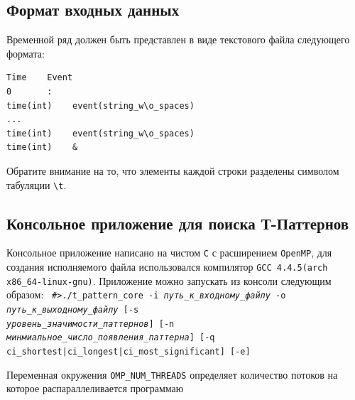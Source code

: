 \documentclass[12pt,fсeqn]{article}
\begin{document}
\subsection{Формат входных данных}
Временной ряд должен быть представлен в виде текстового файла следующего формата:
\begin{verbatim}
Time    Event
0       :
time(int)    event(string_w\o_spaces)
...
time(int)    event(string_w\o_spaces)
time(int)    &
\end{verbatim}
Обратите внимание на то, что элементы каждой строки разделены
символом табуляции \verb!\t!.

\subsection{Консольное приложение для поиска Т-Паттернов}
Консольное приложение написано на чистом \verb!C! с расширением \verb!OpenMP!, для
создания исполняемого файла использовался компилятор \verb!GCC 4.4.5(arch x86_64-linux-gnu)!. Приложение
можно запускать из консоли следующим образом:
\texttt{
\#>./t\_pattern\_core -i {\em путь\_к\_входному\_файлу} -o {\em путь\_к\_выходному\_файлу}
[-s \\{\em уровень\_значимости\_паттернов}] [-n {\em минмиальное\_число\_появления\_паттерна}]
[-q ci\_shortest|ci\_longest|ci\_most\_significant] [-e]
}

Переменная окружения \verb!OMP_NUM_THREADS! определяет количество потоков на которое
распараллеливается программаю
\end{document}
